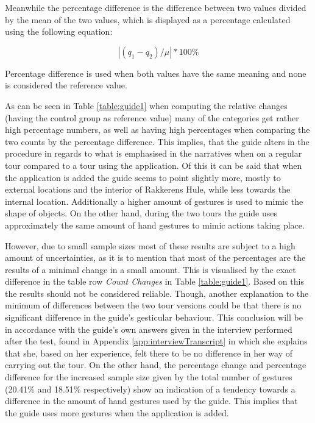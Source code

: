 Meanwhile the percentage difference is the difference between two values divided by the mean of the two values, which is displayed as a percentage calculated using the following equation:

\begin{equation}
|(q_1 -q_2)/\mu | * 100\%
\end{equation}

Percentage difference is used when both values have the same meaning and none is considered the reference value.


As can be seen in Table \ref{table:guide1} when computing the relative changes (having the control group as reference value) many of the categories get rather high percentage numbers, as well as having high percentages when comparing the two counts by the percentage difference. This implies, that the guide alters in the procedure in regards to what is emphasised in the narratives when on a regular tour compared to a tour using the application. Of this it can be said that when the application is added the guide seems to point slightly more, mostly to external locations and the interior of Rakkerens Hule, while less towards the internal location.  Additionally a higher amount of gestures is used to mimic the shape of objects. On the other hand, during the two tours the guide uses approximately the same amount of hand gestures to mimic actions taking place.

However, due to small sample sizes most of these results are subject to a high amount of uncertainties, as it is to mention that most of the percentages are the results of a minimal change in a small amount. This is visualised by the exact difference in the table row \textit{Count Changes} in Table \ref{table:guide1}. Based on this the results should not be considered reliable. Though, another explanation to the minimum of differences between the two tour versions could be that there is no significant difference in the guide’s gesticular behaviour. This conclusion will be in accordance with the guide’s own answers given in the interview performed after the test, found in Appendix \ref{app:interviewTranscript} in which she explains that she, based on her experience, felt there to be no difference in her way of carrying out the tour.  On the other hand, the percentage change and percentage difference for the increased sample size given by the total number of gestures (20.41\% and 18.51\% respectively) show an indication of a tendency towards a difference in the amount of hand gestures used by the guide. This implies that the guide uses more gestures when the application is added. 

